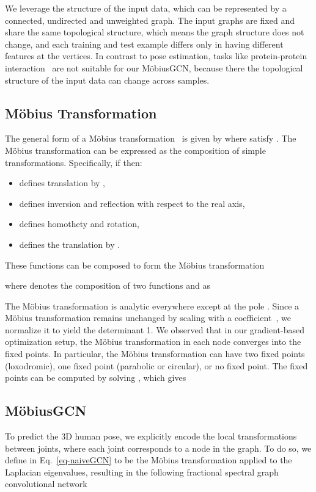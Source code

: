 \documentclass[runningheads]{llncs}
\begin{document}
We leverage the structure of the input data, which can be represented by a connected, undirected and unweighted graph.
The input graphs are fixed and share the same topological structure, which means the graph structure does not change, and each training and test example differs only in having different features at the vertices. In contrast to pose estimation, tasks like protein-protein interaction~\cite{velivckovic2017graph} are not suitable for our M\"obiusGCN, because there the topological structure of the input data can change across samples.

\subsection{M\"{o}bius Transformation}
The general form of a M\"{o}bius transformation~\cite{mandic2009complex} is given by
 where  satisfy . The M\"{o}bius transformation can be expressed as the composition of simple transformations.
Specifically, if  then:
\begin{itemize}
\itemsep0em
    \item  defines translation by ,
    \item   defines inversion and reflection with respect to the real axis,
    \item  defines homothety and rotation,
    \item  defines the translation by .
\end{itemize}
These functions can be composed to form the M\"obius transformation

where  denotes the composition of two functions  and  as


 The M\"obius transformation is analytic everywhere except at the pole . 
 Since a M\"{o}bius transformation remains unchanged by scaling with a coefficient~\cite{mandic2009complex}, we normalize it to yield the determinant 1. 
We observed that in our gradient-based optimization setup, the M\"{o}bius transformation in each node converges into the fixed points. In particular, the M\"obius transformation can have two fixed points (loxodromic), one fixed point (parabolic or circular), or no fixed point. The fixed points can be computed by solving , which gives 




\subsection{M\"obiusGCN}

To predict the 3D human pose, we explicitly encode the local transformations between joints, where each joint corresponds to a node in the graph. To do so, we define  in Eq.~\eqref{eq-naiveGCN} to be the M\"{o}bius transformation applied to the Laplacian eigenvalues, resulting in the following fractional spectral graph convolutional network
\end{document}
